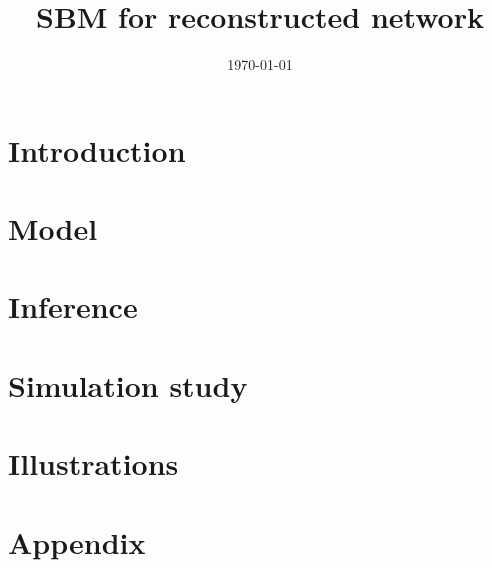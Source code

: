 \documentclass[a4paper]{article}
\begin{document}
\title{SBM for reconstructed network}

\author{} 

\date{\today}
\maketitle

\tableofcontents

\newpage \section{Introduction}

\newpage \section{Model}


\newpage \section{Inference}


\newpage \section{Simulation study}


\newpage \section{Illustrations}


\appendix

\newpage \section{Appendix}


\end{document}
